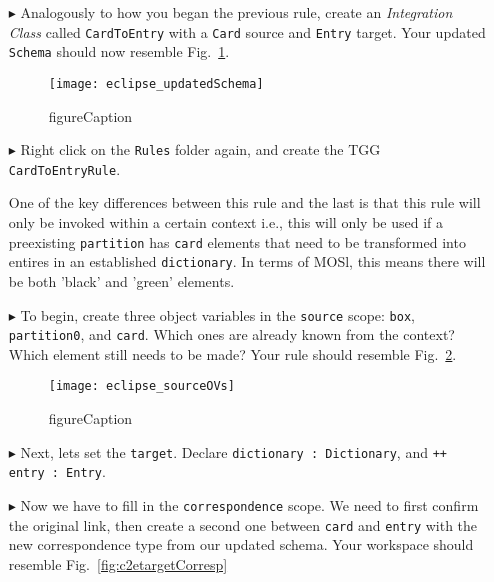 \begin{itemize} 

\item[$\blacktriangleright$] Analogously to how you began the previous rule, create an \emph{Integration Class} called \texttt{CardToEntry} with a \texttt{Card}
source and \texttt{Entry} target. Your updated \texttt{Schema} should now resemble Fig.~\ref{fig:updatedSchema}.

\begin{figure}[htbp]
\begin{center}
  \texttt{[image: eclipse\_updatedSchema]}
  \caption{figureCaption}
  \label{fig:updatedSchema}
\end{center}
\end{figure}

\item[$\blacktriangleright$] Right click on the \texttt{Rules} folder again, and create the TGG \texttt{CardToEntryRule}.

One of the key differences between this rule and the last is that this rule will only be invoked within a certain context i.e.,
this will only be used if a preexisting \texttt{partition} has \texttt{card} elements that need to be transformed into entires in an established
\texttt{dictionary}. In terms of MOSl, this means there will be both 'black' and 'green' elements.

\item[$\blacktriangleright$] To begin, create three object variables in the \texttt{source} scope: \texttt{box}, \texttt{partition0}, and \texttt{card}. Which
ones are already known from the context? Which element still needs to be made? Your rule should resemble Fig.~\ref{fig:c2eRuleSource}.

\begin{figure}[htbp]
\begin{center}
  \texttt{[image: eclipse\_sourceOVs]}
  \caption{figureCaption}
  \label{fig:c2eRuleSource}
\end{center}
\end{figure}

\item[$\blacktriangleright$] Next, lets set the \texttt{target}. Declare \texttt{dictionary : Dictionary}, and \texttt{++ entry : Entry}.

\item[$\blacktriangleright$] Now we have to fill in the \texttt{correspondence} scope. We need to first confirm the original link, then create a second one
between \texttt{card} and \texttt{entry} with the new correspondence type from our updated schema. Your workspace should resemble Fig.~\ref{fig:c2etargetCorresp}


\end{itemize}

